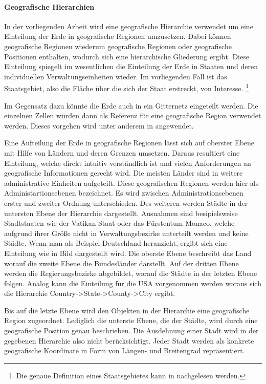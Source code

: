 		\paragraph*{Geografische Hierarchien}
		In der vorliegenden Arbeit wird eine geografische Hierarchie verwendet um eine Einteilung der Erde in geografische Regionen umzusetzen.
		Dabei können geografische Regionen wiederum geografische Regionen oder geografische Positionen enthalten, wodurch sich eine hierarchische Gliederung ergibt.
		Diese Einteilung spiegelt im wesentlichen die Einteilung der Erde in Staaten und deren individuellen Verwaltungseinheiten wieder.
		Im vorliegenden Fall ist das Staatsgebiet, also die Fläche über die sich der Staat erstreckt, von Interesse. \footnote{Die genaue Definition eines Staatsgebietes kann in \cite{jellinek1921} nachgelesen werden.} 

		Im Gegensatz dazu könnte die Erde auch in ein Gitternetz eingeteilt werden. 
		Die einzelnen Zellen würden dann als Referenz für eine geografische Region verwendet werden.
		Dieses vorgehen wird unter anderem in \cite{Serdyukov2009} angewendet.

		Eine Aufteilung der Erde in geografische Regionen lässt sich auf oberster Ebene mit Hilfe von Ländern und deren Grenzen umsetzen. 
		Daraus resultiert eine Einteilung, welche direkt intuitiv verständlich ist und vielen Anforderungen an geografische Informationen gerecht wird.
		Die meisten Länder sind in weitere administrative Einheiten aufgeteilt.
		Diese geografischen Regionen werden hier als Administartionsebenen bezeichnet.
		Es wird zwischen Administrationsebenen erster und zweiter Ordnung unterschieden. 
		Des weiteren werden Städte in der untersten Ebene der Hierarchie dargestellt.
		Ausnahmen sind besipielsweise Stadtstaaten wie der Vatikan-Staat oder das Fürstentum Monaco, welche aufgrund ihrer Größe nicht in Verwaltungsbezirke unterteilt werden und keine Städte.
		Wenn man als Beispiel Deutschland heranzieht, ergibt sich eine Einteilung wie in Bild  dargestellt wird.
		Die oberste Ebene beschreibt das Land worauf die zweite Ebene die Bundesländer darstellt.
		Auf der dritten Ebene werden die Regierungsbezirke abgebildet, worauf die Städte in der letzten Ebene folgen. 
		Analog kann die Einteilung für die USA vorgenommen werden woraus sich die Hierarchie Country->State->County->City ergibt.

		Bis auf die letzte Ebene wird den Objekten in der Hierarchie eine geografische Region zugeordnet. 
		Lediglich die unterste Ebene, die der Städte, wird durch eine geografische Position genau beschrieben. 
		Die Ausdehnung einer Stadt wird in der gegebenen Hierarchie also nicht berücksichtigt. 
		Jeder Stadt werden als konkrete geografische Koordinate in Form von Längen- und Breitengrad repräsentiert. 

